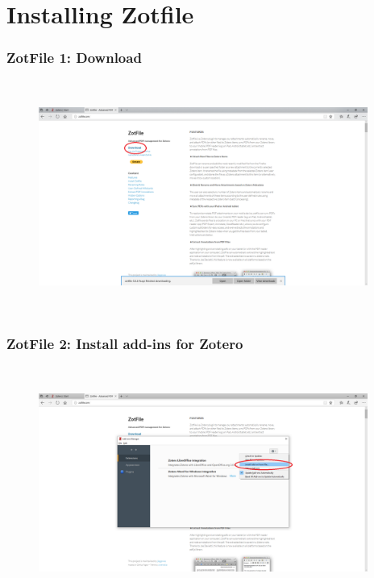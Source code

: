 \documentclass[12pt]{beamer}
\begin{document}
\section{Installing Zotfile}

\begin{frame} \frametitle{ZotFile 1: Download} \begin{figure}[!h] \centering
	\includegraphics[height=3in, width = 4.25in,keepaspectratio]{zotero/zotfile_1.png}
\end{figure} \end{frame}

\begin{frame} \frametitle{ZotFile 2: Install add-ins for Zotero} \begin{figure}[!h] \centering
	\includegraphics[height=3in, width = 4.25in,keepaspectratio]{zotero/zotfile_2.png}
\end{figure} \end{frame}
\end{document}
